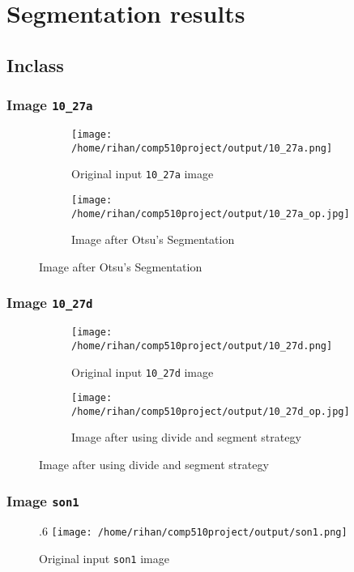 \chapter{Segmentation results}
\section{Inclass}

\subsection{Image \texttt{10\_27a}}
\begin{figure}[H]
  \begin{subfigure}{.6\textwidth}
    \centering
    \texttt{[image: /home/rihan/comp510project/output/10\_27a.png]}
    \caption{Original input \texttt{10\_27a} image}
  \end{subfigure}%
  \begin{subfigure}{.6\textwidth}
    \centering
    \texttt{[image: /home/rihan/comp510project/output/10\_27a\_op.jpg]}
    \caption{Image after Otsu's Segmentation}
  \end{subfigure}
\end{figure}

\subsection{Image \texttt{10\_27d}}
\begin{figure}[H]
  \begin{subfigure}{.5\textwidth}
    \centering
    \texttt{[image: /home/rihan/comp510project/output/10\_27d.png]}
    \caption{Original input \texttt{10\_27d} image}
  \end{subfigure}%
  \begin{subfigure}{.6\textwidth}
    \centering
    \texttt{[image: /home/rihan/comp510project/output/10\_27d\_op.jpg]}
    \caption{Image after using divide and segment strategy}
  \end{subfigure}
\end{figure}


\pagebreak

\subsection{Image \texttt{son1}}
\begin{figure}[h!]{.6\textwidth}
  \centering
  \texttt{[image: /home/rihan/comp510project/output/son1.png]}
  \caption{Original input \texttt{son1} image}
\end{figure}

